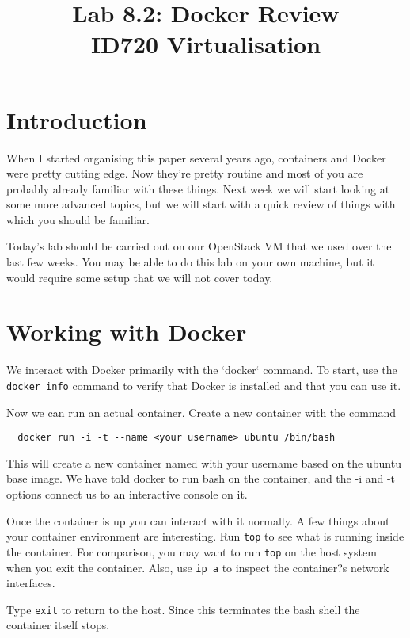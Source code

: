 \documentclass{article}
\begin{document}
\title{Lab 8.2: Docker Review\\ ID720 Virtualisation}
\date{}
\maketitle

\section*{Introduction}
When I started organising this paper several years ago, containers and Docker were pretty cutting edge. Now they're pretty routine and most of you are probably already familiar with these things. Next week we will start looking at some more advanced topics, but we will start with a quick review of things with which you should be familiar.

Today's lab should be carried out on our OpenStack VM that we used over the last few weeks. You may be able to do this lab on your own machine, but it would require some setup that we will not cover today.
     
\section{Working with Docker}
We interact with Docker primarily with the `docker` command. To start, use the \texttt{docker info} command to verify that Docker is installed and that you can use it.

Now we can run an actual container. Create a new container with the command

\begin{verbatim}
  docker run -i -t --name <your username> ubuntu /bin/bash
\end{verbatim}
  
This will create a new container named with your username based on the ubuntu base image. We have told docker to run
bash on the container, and the -i and -t options connect us to an interactive console on it.

Once the container is up you can interact with it normally. A few things about your container environment are interesting. Run \texttt{top} to see what is running inside the container. For comparison, you may want to run \texttt{top} on the host system when you exit the container. Also, use \texttt{ip a} to inspect the container?s network interfaces.

Type \texttt{exit} to return to the host. Since this terminates the bash shell the container itself stops.
\end{document}
